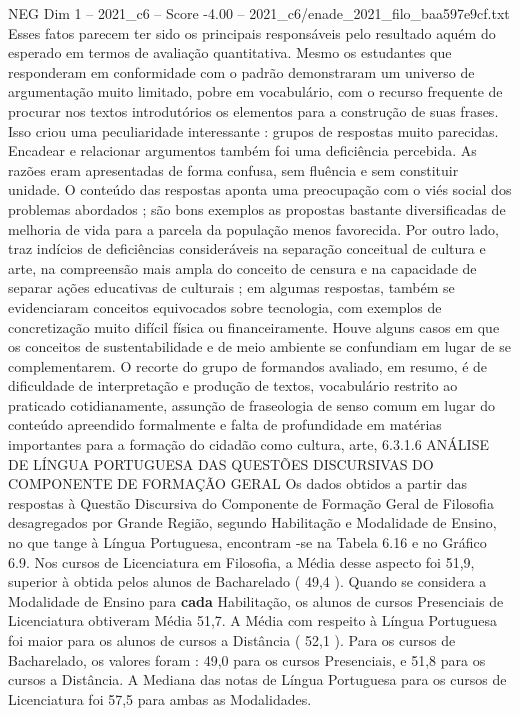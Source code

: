 \begin{textsample}{NEG Dim 1 – 2021\_c6 – Score -4.00 – 2021\_c6/enade\_2021\_filo\_baa597e9cf.txt}
Esses fatos parecem ter sido os principais responsáveis pelo resultado aquém do esperado em termos de avaliação quantitativa.
Mesmo os estudantes que responderam em conformidade com o padrão demonstraram um universo de argumentação muito limitado, pobre em vocabulário, com o recurso frequente de procurar nos textos introdutórios os elementos para a construção de suas frases.
Isso criou uma peculiaridade interessante : grupos de respostas muito parecidas.
Encadear e relacionar argumentos também foi uma deficiência percebida.
As razões eram apresentadas de forma confusa, sem fluência e sem constituir unidade.
O conteúdo das respostas aponta uma preocupação com o viés social dos problemas abordados ; são bons exemplos as propostas bastante diversificadas de melhoria de vida para a parcela da população menos favorecida.
Por outro lado, traz indícios de deficiências consideráveis na separação conceitual de cultura e arte, na compreensão mais ampla do conceito de censura e na capacidade de separar ações educativas de culturais ; em algumas respostas, também se evidenciaram conceitos equivocados sobre tecnologia, com exemplos de concretização muito difícil física ou financeiramente.
Houve alguns casos em que os conceitos de sustentabilidade e de meio ambiente se confundiam em lugar de se complementarem.
O recorte do grupo de formandos avaliado, em resumo, é de dificuldade de interpretação e produção de textos, vocabulário restrito ao praticado cotidianamente, assunção de fraseologia de senso comum em lugar do conteúdo apreendido formalmente e falta de profundidade em matérias importantes para a formação do cidadão como cultura, arte, 6.3.1.6 ANÁLISE DE LÍNGUA PORTUGUESA DAS QUESTÕES DISCURSIVAS DO COMPONENTE DE FORMAÇÃO GERAL Os dados obtidos a partir das respostas à Questão Discursiva do Componente de Formação Geral de Filosofia desagregados por Grande Região, segundo Habilitação e Modalidade de Ensino, no que tange à Língua Portuguesa, encontram -se na Tabela 6.16 e no Gráfico 6.9.
Nos cursos de Licenciatura em Filosofia, a Média desse aspecto foi 51,9, superior à obtida pelos alunos de Bacharelado ( 49,4 ).
Quando se considera a Modalidade de Ensino para \textbf{cada} Habilitação, os alunos de cursos Presenciais de Licenciatura obtiveram Média 51,7.
A Média com respeito à Língua Portuguesa foi maior para os alunos de cursos a Distância ( 52,1 ).
Para os cursos de Bacharelado, os valores foram : 49,0 para os cursos Presenciais, e 51,8 para os cursos a Distância.
A Mediana das notas de Língua Portuguesa para os cursos de Licenciatura foi 57,5 para ambas as Modalidades.

\end{textsample}
